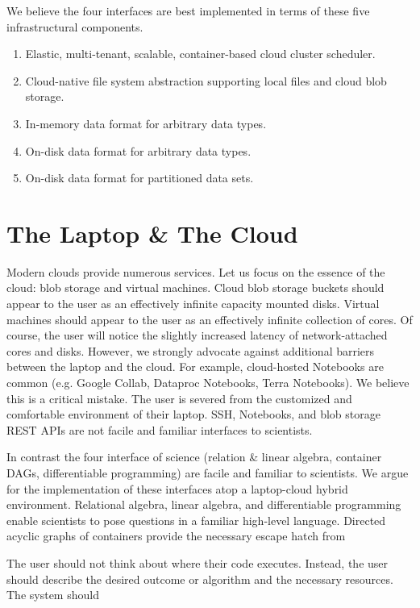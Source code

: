\documentclass[10pt]{article}
\begin{document}
We believe the four interfaces are best implemented in terms of these five infrastructural
components.

\begin{enumerate}
\item Elastic, multi-tenant, scalable, container-based cloud cluster scheduler.
\item Cloud-native file system abstraction supporting local files and cloud blob storage.
\item In-memory data format for arbitrary data types.
\item On-disk data format for arbitrary data types.
\item On-disk data format for partitioned data sets.
\end{enumerate}

\section{The Laptop \& The Cloud}

Modern clouds provide numerous services.
Let us focus on the essence of the cloud: blob storage and virtual machines.
Cloud blob storage buckets should appear to the user as an effectively infinite capacity mounted disks.
Virtual machines should appear to the user as an effectively infinite collection of cores.
Of course, the user will notice the slightly increased latency of network-attached cores and disks.
However, we strongly advocate against additional barriers between the laptop and the cloud.
For example, cloud-hosted Notebooks are common (e.g. Google Collab, Dataproc Notebooks, Terra Notebooks).
We believe this is a critical mistake.
The user is severed from the customized and comfortable environment of their laptop.
SSH, Notebooks, and blob storage REST APIs are not facile and familiar interfaces to scientists.

In contrast the four interface of science (relation \& linear algebra, container DAGs, differentiable programming) are facile and familiar to scientists.
We argue for the implementation of these interfaces atop a laptop-cloud hybrid environment.
Relational algebra, linear algebra, and differentiable programming enable scientists to pose questions in a familiar high-level language.
Directed acyclic graphs of containers provide the necessary escape hatch from 

The user should not think about where their code executes.
Instead, the user should describe the desired outcome or algorithm and the necessary resources.
The system should 
\end{document}
